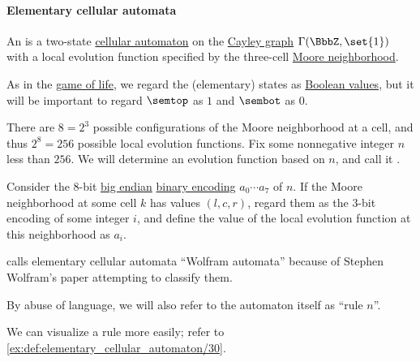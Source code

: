 \paragraph{Elementary cellular automata}

\begin{definition}\label{def:elementary_cellular_automaton}
  An  is a two-state \hyperref[def:cellular_automaton]{cellular automaton} on the \hyperref[def:cayley_graph]{Cayley graph} \( \Gamma(\BbbZ, \set{ 1 }) \) with a local evolution function specified by the three-cell \hyperref[def:cayley_graph_neighborhood/moore]{Moore neighborhood}.

  As in the \hyperref[def:game_of_life]{game of life}, we regard the (elementary) states as \hyperref[def:truth_value_algebra]{Boolean values}, but it will be important to regard \( \semtop \) as \( 1 \) and \( \sembot \) as \( 0 \).

  There are \( 8 = 2^3 \) possible configurations of the Moore neighborhood at a cell, and thus \( 2^8 = 256 \) possible local evolution functions. Fix some nonnegative integer \( n \) less than \( 256 \). We will determine an evolution function based on \( n \), and call it .

  Consider the \( 8 \)-bit \hyperref[def:endianness/big]{big endian} \hyperref[def:ring_of_unsigned_integers]{binary encoding} \( a_0 \cdots a_7 \) of \( n \). If the Moore neighborhood at some cell \( k \) has values \( (l, c, r) \), regard them as the \( 3 \)-bit encoding of some integer \( i \), and define the value of the local evolution function at this neighborhood as \( a_i \).
\end{definition}
\begin{comments}
  \item \Textcite[6]{HadelerMüller2017CellularAutomata} calls elementary cellular automata \enquote{Wolfram automata} because of Stephen Wolfram's paper \cite{Wolfram1983StatisticalMechanicsOfCellularAutomata} attempting to classify them.

  \item By abuse of language, we will also refer to the automaton itself as \enquote{rule \( n \)}.

  \item We can visualize a rule more easily; refer to \cref{ex:def:elementary_cellular_automaton/30}.
\end{comments}

